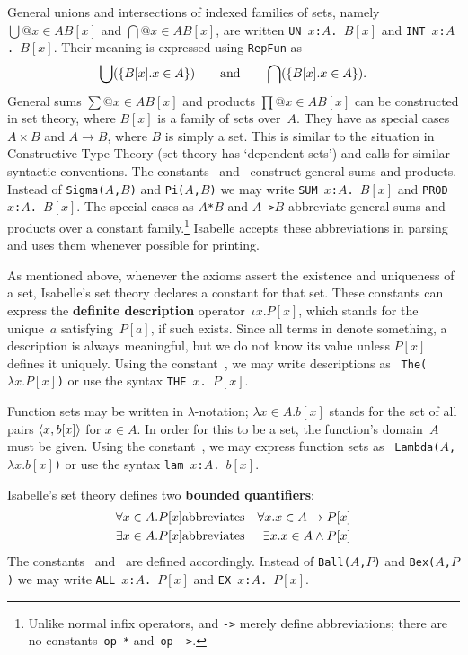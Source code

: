 General unions and intersections of indexed
families of sets, namely $\bigcup@{x\in A}B[x]$ and $\bigcap@{x\in A}B[x]$,
are written \hbox{\tt UN $x$:$A$. $B[x]$} and \hbox{\tt INT $x$:$A$. $B[x]$}.
Their meaning is expressed using \texttt{RepFun} as
\[
\bigcup(\{B[x]. x\in A\}) \qquad\hbox{and}\qquad 
\bigcap(\{B[x]. x\in A\}). 
\]
General sums $\sum@{x\in A}B[x]$ and products $\prod@{x\in A}B[x]$ can be
constructed in set theory, where $B[x]$ is a family of sets over~$A$.  They
have as special cases $A\times B$ and $A\to B$, where $B$ is simply a set.
This is similar to the situation in Constructive Type Theory (set theory
has `dependent sets') and calls for similar syntactic conventions.  The
constants~ and~ construct general sums and
products.  Instead of \texttt{Sigma($A$,$B$)} and \texttt{Pi($A$,$B$)} we may write
\hbox{\tt SUM $x$:$A$. $B[x]$} and \hbox{\tt PROD $x$:$A$. $B[x]$}.  
%
The special cases as \hbox{\tt$A$*$B$} and \hbox{\tt$A$->$B$} abbreviate
general sums and products over a constant family.\footnote{Unlike normal
infix operators, {\tt*} and {\tt->} merely define abbreviations; there are
no constants~{\tt op~*} and~\hbox{\tt op~->}.} Isabelle accepts these
abbreviations in parsing and uses them whenever possible for printing.

As mentioned above, whenever the axioms assert the existence and uniqueness
of a set, Isabelle's set theory declares a constant for that set.  These
constants can express the {\bf definite description} operator~$\iota
x. P[x]$, which stands for the unique~$a$ satisfying~$P[a]$, if such exists.
Since all terms in {\ZF} denote something, a description is always
meaningful, but we do not know its value unless $P[x]$ defines it uniquely.
Using the constant~, we may write descriptions as {\tt
  The($\lambda x. P[x]$)} or use the syntax \hbox{\tt THE $x$. $P[x]$}.

Function sets may be written in $\lambda$-notation; $\lambda x\in A. b[x]$
stands for the set of all pairs $\langle x,b[x]\rangle$ for $x\in A$.  In order for
this to be a set, the function's domain~$A$ must be given.  Using the
constant~, we may express function sets as {\tt
Lambda($A$,$\lambda x. b[x]$)} or use the syntax \hbox{\tt lam $x$:$A$. $b[x]$}.

Isabelle's set theory defines two {\bf bounded quantifiers}:
\begin{eqnarray*}
   \forall x\in A. P[x] &\hbox{abbreviates}& \forall x. x\in A\rightarrow P[x] \\
   \exists x\in A. P[x] &\hbox{abbreviates}& \exists x. x\in A\wedge P[x]
\end{eqnarray*}
The constants~ and~ are defined
accordingly.  Instead of \texttt{Ball($A$,$P$)} and \texttt{Bex($A$,$P$)} we may
write
\hbox{\tt ALL $x$:$A$. $P[x]$} and \hbox{\tt EX $x$:$A$. $P[x]$}.



